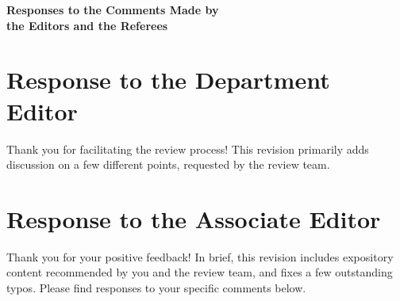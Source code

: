 \documentclass[11pt]{article}
\newcommand{\1}{\ensuremath{\mathbf{1}}} %
\theoremstyle{thm-sf}
\begin{document}
	\begin{center} {\Large {\sffamily\bfseries Responses to the Comments Made by \\
				the Editors and the Referees}}
	\end{center}
	
	\bigskip
	
	\section{Response to the Department Editor}
	
	Thank you for facilitating the review process! This revision primarily adds discussion on a few different points, requested by the review team. 
	
	
	\section{Response to the Associate Editor}
	
	Thank you for your positive feedback! In brief, this revision includes expository content recommended by you and the review team, and fixes a few outstanding typos. Please find responses to your specific comments below.
	
\end{document}
